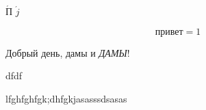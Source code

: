 \documentclass[12pt, a4paper]{article}
\begin{document}
     
    
    $\acute{П}$
    $\acute{j}$

    \begin{equation}
        \text{привет} = 1
    \end{equation}

    Добрый день, дамы и \textit{ДАМЫ}!

    dfdf

    lfghfghfgk;dhfgkjasasssdsasas
\end{document}
